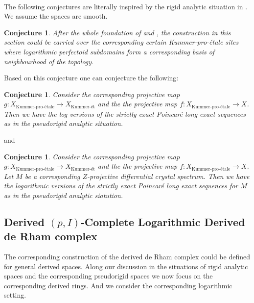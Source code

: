 \documentclass[11pt]{book}
\newtheorem{conjecture}[theorem]{Conjecture}
\theoremstyle{definition}
\numberwithin{equation}{section}
\begin{document}
\

\indent The following conjectures are literally inspired by the rigid analytic situation in \cite[Theorem 1.2]{12GL}. We assume the spaces are smooth.


\begin{conjecture}
After the whole foundation of \cite{12DLLZ1} and \cite[Theorem 2.9.9, Remark 2.9.10]{12Ked1}, the construction in this section could be carried over the corresponding certain Kummer-pro-\'etale sites where logarithmic perfectoid subdomains form a corresponding basis of neighbourhood of the topology.	
\end{conjecture}


\indent Based on this conjecture one can conjecture the following:

\begin{conjecture}
Consider the corresponding projective map $g:X_{\text{Kummer-pro-\'etale}}\rightarrow X_{\text{Kummer-\'et}}$ and the the projective map $f:X_{\text{Kummer-pro-\'etale}}\rightarrow X$. Then we have the log versions of the strictly exact Poincar\'e long exact sequences as in the pseudorigid analytic situation.
\end{conjecture}



and



\begin{conjecture}
Consider the corresponding projective map $g:X_{\text{Kummer-pro-\'etale}}\rightarrow X_{\text{Kummer-\'et}}$ and the the projective map $f:X_{\text{Kummer-pro-\'etale}}\rightarrow X$. Let $M$ be a corresponding $Z$-projective differential crystal spectrum. Then we have the logarithmic versions of the strictly exact Poincar\'e long exact sequences for $M$ as in the pseudorigid analytic siatution.
\end{conjecture}










\newpage

\subsection{Derived $(p,I)$-Complete Logarithmic Derived de Rham complex}





\indent The corresponding construction of the derived de Rham complex could be defined for general derived spaces. Along our discussion in the situations of rigid analytic spaces and the corresponding pseudorigid spaces we now focus on the corresponding derived  rings. And we consider the corresponding logarithmic setting. 
\end{document}

